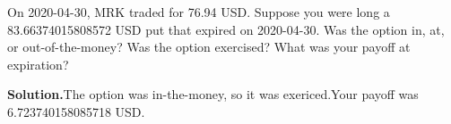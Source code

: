 \noindent On 2020-04-30, MRK traded for 76.94 USD. Suppose you were long a 83.66374015808572 USD put that expired on 2020-04-30. Was the option in, at, or out-of-the-money? Was the option exercised? What was your payoff at expiration?

\vspace{9pt} 

\textbf{Solution.}The option was in-the-money, so it was exericed.Your payoff was 6.723740158085718 USD.